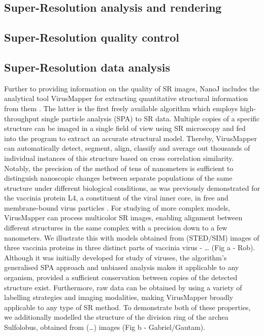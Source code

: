 \subsection*{Super-Resolution analysis and rendering}
\Blindtext

\subsection*{Super-Resolution quality control}
\Blindtext

\subsection*{Super-Resolution data analysis}
Further to providing information on the quality of SR images, NanoJ includes the analytical tool VirusMapper for extracting quantitative structural information from them \cite{gray2016virus,gray2017}. The latter is the first freely available algorithm which employs high-throughput single particle analysis (SPA) to SR data. Multiple copies of a specific structure can be imaged in a single field of view using SR microscopy and fed into the program to extract an accurate structural model. Thereby, VirusMapper can automatically detect, segment, align, classify and average out thousands of individual instances of this structure based on cross correlation similarity. Notably, the precision of the method of tens of nanometers is sufficient to distinguish nanoscopic changes between separate populations of the same structure under different biological conditions, as was previously demonstrated for the vaccinia protein L4, a constituent of the viral inner core, in free and membrane-bound virus particles \cite{gray2016virus}. For studying of more complex models, VirusMapper can process multicolor SR images, enabling alignment between different structures in the same complex with a precision down to a few nanometers. We illustrate this with models obtained from (STED/SIM) images of three vaccinia proteins in three distinct parts of vaccinia virus - … (Fig a - Rob). 
\newline
Although it was initially developed for study of viruses, the algorithm’s generalised SPA approach and unbiased analysis makes it applicable to any organism, provided a sufficient conservation between copies of the detected structure exist. Furthermore, raw data can be obtained by using a variety of labelling strategies and imaging modalities, making VirusMapper broadly applicable to any type of SR method. To demonstrate both of these properties, we additionally modelled the structure of the division ring of the archea Sulfolobus, obtained from (…) images (Fig b - Gabriel/Gautam). 


